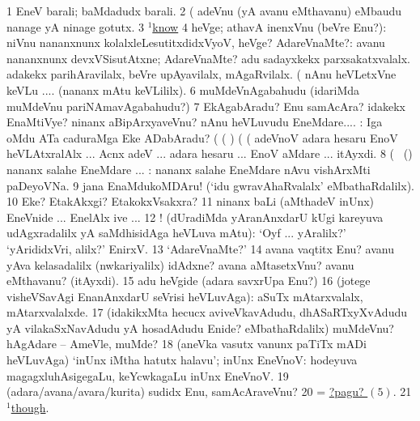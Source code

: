 \noindent 
\gl{\pagu}
\expl{}
\bmng
\bnum
\num{1}  EneV barali; baMdadudx barali. 
\num{2}  (    adeVnu (yA avanu eMthavanu) eMbaudu nanage yA ninage gotutx. 
\num{3} \hyperref{kandict_k.pdf}{K}{know(1) nuga(28)}{$^1$know}  
\num{4}   heVge; athavA inenxVnu (beVre Enu?):  niVnu nananxnunx kolalxleLesutitxdidxVyoV, heVge? 
  
\banum
{} AdareVnaMte?:  avanu nananxnunx devxVSisutAtxne; AdareVnaMte? adu sadayxkekx parxsakatxvalalx. 
 adakekx parihAravilalx, beVre upAyavilalx, mAgaRvilalx.  (  nAnu heVLetxVne keVLu .... (nananx mAtu keVLililx). 
\eanum
\numie
\num{6}  muMdeVnAgabahudu (idariMda muMdeVnu pariNAmavAgabahudu?) 
\num{7}  EkAgabAradu? Enu samAcAra? idakekx EnaMtiVye? ninanx aBipArxyaveVnu? nAnu heVLuvudu EneMdare.... :  Iga oMdu ATa caduraMga Eke ADabAradu?  (  ( ) (  (  adeVnoV adara hesaru EnoV heVLAtxralAlx ... Acnx adeV ... adara hesaru ... EnoV aMdare ... itAyxdi. 
\num{8}  (\ame\  (\AmA) nananx salahe EneMdare ... :  nananx salahe EneMdare nAvu vishArxMti paDeyoVNa. 
\num{9}  jana EnaMdukoMDAru! (`idu gwravAhaRvalalx' eMbathaRdalilx). 
\num{10}  Eke? EtakAkxgi? EtakokxVsakxra? 
\num{11}  ninanx baLi (aMthadeV inUnx) EneVnide ... EnelAlx ive ... 
\num{12} ! (dUradiMda yAranAnxdarU kUgi kareyuva udAgxradalilx yA saMdhisidAga heVLuva mAtu): `Oyf ... yAralilx?' `yArididxVri, alilx?' EnirxV. 
\num{13}  `AdareVnaMte?' 
\num{14}  avana vaqtitx Enu? avanu yAva kelasadalilx (nwkariyalilx) idAdxne? avana aMtasetxVnu? avanu eMthavanu? (itAyxdi). 
\num{15}  adu heVgide (adara savxrUpa Enu?) 
\num{16}  (jotege visheVSavAgi EnanAnxdarU seVrisi heVLuvAga): aSuTx mAtarxvalalx, mAtarxvalalxde. 
\num{17}  (idakikxMta hecucx aviveVkavAdudu, dhASaRTxyXvAdudu yA vilakaSxNavAdudu yA hosadAdudu Enide? eMbathaRdalilx) muMdeVnu? hAgAdare -- AmeVle, muMde? 
\num{18}  (aneVka vasutx \mo vanunx paTiTx mADi heVLuvAga) `inUnx iMtha hatutx halavu'; inUnx EneVnoV:  hodeyuva magagxluhAsigegaLu, keYcwkagaLu inUnx EneVnoV. 
\num{19}  (adara/avana/avara/kurita) sudidx Enu, samAcAraveVnu? 
\num{20}  = \hyperlink{what2 pagu5}{?pagu? \((5)\)}. 
\num{21}  \hyperref{kandict_t.pdf}{T}{though(1) pagu(2)}{$^1$though}. 
\enum
\emng
\eentry

